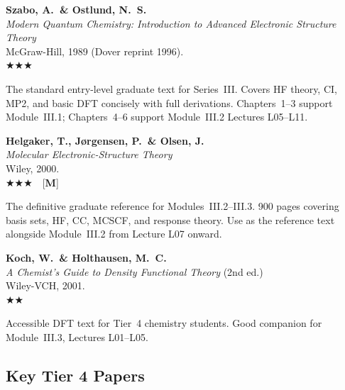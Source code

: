 \documentclass[11pt,a4paper]{article}
\newcommand{\essential}{$\bigstar\bigstar\bigstar$}
\newcommand{\recommended}{$\bigstar\bigstar$}
\newenvironment{bibentry}[1]{%
  \begin{tcolorbox}[entrybox=#1, top=4pt, bottom=4pt]%
}{%
  \end{tcolorbox}\smallskip%
}
\begin{document}
\begin{bibentry}{t4light}
\textbf{Szabo, A.\ \& Ostlund, N.~S.}\\
\textit{Modern Quantum Chemistry: Introduction to Advanced Electronic Structure Theory}\\
McGraw-Hill, 1989 (Dover reprint 1996).\\[4pt]
\essential\\[4pt]
\begin{tcolorbox}[annotbox]
The standard entry-level graduate text for Series~III. Covers HF theory, CI, MP2,
and basic DFT concisely with full derivations. Chapters~1--3 support
Module~III.1; Chapters~4--6 support Module~III.2 Lectures L05--L11.
\end{tcolorbox}
\end{bibentry}

\begin{bibentry}{t4light}
\textbf{Helgaker, T., J\o rgensen, P.\ \& Olsen, J.}\\
\textit{Molecular Electronic-Structure Theory}\\
Wiley, 2000.\\[4pt]
\essential\ \ [\textbf{M}]\\[4pt]
\begin{tcolorbox}[annotbox]
The definitive graduate reference for Modules~III.2--III.3. 900 pages covering
basis sets, HF, CC, MCSCF, and response theory. Use as the reference text alongside
Module~III.2 from Lecture L07 onward.
\end{tcolorbox}
\end{bibentry}

\begin{bibentry}{t4light}
\textbf{Koch, W.\ \& Holthausen, M.~C.}\\
\textit{A Chemist's Guide to Density Functional Theory} (2nd ed.)\\
Wiley-VCH, 2001.\\[4pt]
\recommended\\[4pt]
\begin{tcolorbox}[annotbox]
Accessible DFT text for Tier~4 chemistry students. Good companion for
Module~III.3, Lectures L01--L05.
\end{tcolorbox}
\end{bibentry}

\subsection{Key Tier 4 Papers}
\end{document}
